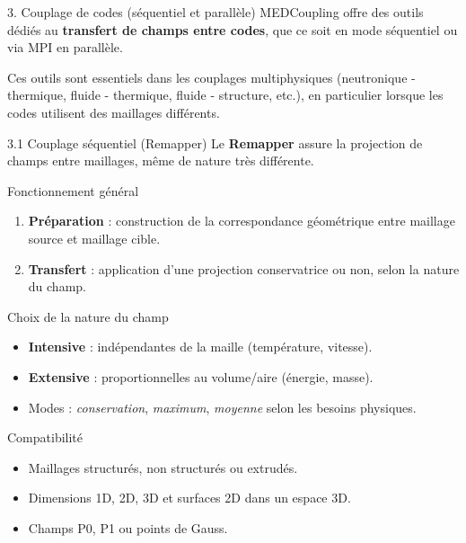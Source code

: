 \begin{frame}{3. Couplage de codes (séquentiel et parallèle)}
\protect\hypertarget{couplage-de-codes-suxe9quentiel-et-paralluxe8le}{}
MEDCoupling offre des outils dédiés au \textbf{transfert de champs entre
codes}, que ce soit en mode séquentiel ou via MPI en parallèle.

Ces outils sont essentiels dans les couplages multiphysiques
(neutronique - thermique, fluide - thermique, fluide - structure, etc.),
en particulier lorsque les codes utilisent des maillages différents.

\begin{block}{3.1 Couplage séquentiel (Remapper)}
\protect\hypertarget{couplage-suxe9quentiel-remapper}{}
Le \textbf{Remapper} assure la projection de champs entre maillages,
même de nature très différente.

\begin{block}{Fonctionnement général}
\protect\hypertarget{fonctionnement-guxe9nuxe9ral}{}
\begin{enumerate}
\tightlist
\item
  \textbf{Préparation} : construction de la correspondance géométrique
  entre maillage source et maillage cible.
\item
  \textbf{Transfert} : application d'une projection conservatrice ou
  non, selon la nature du champ.
\end{enumerate}
\end{block}

\begin{block}{Choix de la nature du champ}
\protect\hypertarget{choix-de-la-nature-du-champ}{}
\begin{itemize}
\tightlist
\item
  \textbf{Intensive} : indépendantes de la maille (température,
  vitesse).
\item
  \textbf{Extensive} : proportionnelles au volume/aire (énergie, masse).
\item
  Modes : \emph{conservation}, \emph{maximum}, \emph{moyenne} selon les
  besoins physiques.
\end{itemize}
\end{block}

\begin{block}{Compatibilité}
\protect\hypertarget{compatibilituxe9}{}
\begin{itemize}
\tightlist
\item
  Maillages structurés, non structurés ou extrudés.
\item
  Dimensions 1D, 2D, 3D et surfaces 2D dans un espace 3D.
\item
  Champs P0, P1 ou points de Gauss.
\end{itemize}
\end{block}
\end{block}


\end{frame}
